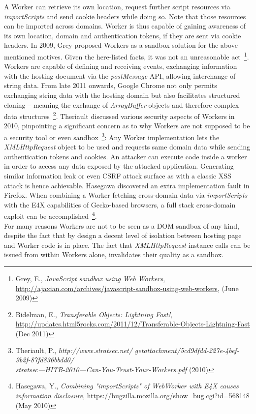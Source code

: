     A Worker can retrieve its own location, request further script resources via \textit{importScripts} and send cookie headers while doing so. Note that those resources can be imported across domains. Worker is thus capable of gaining awareness of its own location, domain and authentication tokens, if they are sent via cookie headers. In 2009, Grey proposed Workers as a sandbox solution for the above mentioned motives. 
    Given the here-listed facts, it was not an unreasonable act~\footnote{Grey, E., \textit{JavaScript sandbox using Web Workers}, \url{http://ajaxian.com/archives/javascript-sandbox-using-web-workers}, (June 2009)}. Workers are capable of defining and receiving events, exchanging information with the hosting document via the \textit{postMessage} API, allowing interchange of string data. From late 2011 onwards, Google Chrome not only permits exchanging string data with the hosting domain but also facilitates structured cloning -- meaning the exchange of \textit{ArrayBuffer} objects and therefore complex data structures~\footnote{Bidelman, E., \textit{Transferable Objects: Lightning Fast!}, \url{http://updates.html5rocks.com/2011/12/Transferable-Objects-Lightning-Fast} (Dec 2011)}. Theriault discussed various security aspects of Workers in 2010, pinpointing a significant concern as to why Workers are not supposed to be a security tool or even sandbox~\footnote{Theriault, P., \textit{http://www.stratsec.net/
getattachment/5cd9dfdd-227e-4bef-9b2f-87fd836bbdd0/\\
stratsec---HITB-2010---Can-You-Trust-Your-Workers.pdf} (2010)}: 
    Any Worker implementation lets the \textit{XMLHttpRequest} object to be used and requests same domain data while sending authentication tokens and cookies. An attacker can execute code inside a worker in order to access any data exposed by the attacked application. Generating similar information leak or even CSRF attack surface as with a classic XSS attack is hence achievable. Hasegawa discovered an extra implementation fault in Firefox. When combining a Worker fetching cross-domain data via \textit{importScripts} with the E4X capabilities of Gecko-based browsers, a full stack cross-domain exploit can be accomplished~\footnote{Hasegawa, Y., \textit{Combining "importScripts" of WebWorker with E4X causes information disclosure}, \url{https://bugzilla.mozilla.org/show_bug.cgi?id=568148} (May 2010)}.\\

    For many reasons Workers are not to be seen as a DOM sandbox of any kind, despite the fact that by design a decent level of isolation between hosting page and Worker code is in place. The fact that \textit{XMLHttpRequest} instance calls can be issued from within Workers alone, invalidates their quality as a sandbox.


